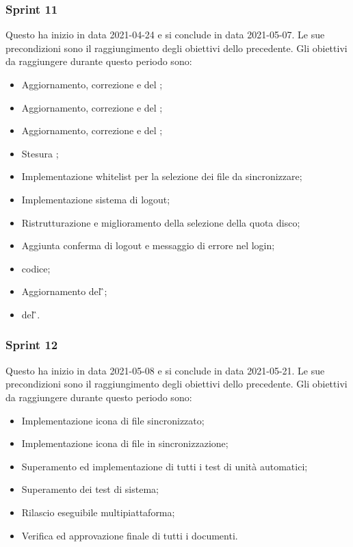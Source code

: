\subsubsection{Sprint 11}
Questo  ha inizio in data 2021-04-24 e si conclude in data 2021-05-07. Le sue precondizioni sono il raggiungimento degli obiettivi dello  precedente.\newline{}
Gli obiettivi da raggiungere durante questo periodo sono:
\begin{itemize}
	\item Aggiornamento, correzione e  del \PdP{};
	\item Aggiornamento, correzione e  del \MS{};
	\item Aggiornamento, correzione e  del \MU{};
	\item Stesura ;
	\item Implementazione whitelist per la selezione dei file da sincronizzare;
	\item Implementazione sistema di logout;
	\item Ristrutturazione e miglioramento della selezione della quota disco;
	\item Aggiunta conferma di logout e messaggio di errore nel login;
	\item {} codice;
	\item Aggiornamento del \G{};
	\item {} del \G{}.
\end{itemize}
\subsubsection{Sprint 12}
Questo  ha inizio in data 2021-05-08 e si conclude in data 2021-05-21. Le sue precondizioni sono il raggiungimento degli obiettivi dello  precedente.\newline{}
Gli obiettivi da raggiungere durante questo periodo sono:
\begin{itemize}
	\item Implementazione icona di file sincronizzato;
	\item Implementazione icona di file in sincronizzazione;
	\item Superamento ed implementazione di tutti i test di unità automatici;
	\item Superamento dei test di sistema;
	\item Rilascio eseguibile multipiattaforma;
	\item Verifica ed approvazione finale di tutti i documenti.
\end{itemize}
